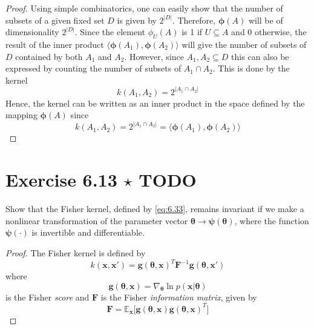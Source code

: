 \begin{proof}
    Using simple combinatorics, one can easily show that the number
    of subsets of a given fixed set $D$ is given by $2^{|D|}$.
    Therefore, $\bm{\phi}(A)$ will be of dimensionality $2^{|D|}$. Since
    the element $\phi_U(A)$ is 1 if $U \subseteq A$ and 0 otherwise,
    the result of the inner product $\langle \bm{\phi}(A_1), \bm{\phi}(A_2) \rangle$
    will give the number of subsets of $D$ contained by both $A_1$ and $A_2$. 
    However, since $A_1, A_2 \subseteq D$ this can also be expressed by counting
    the number of subsets of $A_1 \cap A_2$. This is done by the kernel
    \begin{equation*}
        k(A_1, A_2) = 2^{|A_1 \cap A_2|}
        \tag{6.27}\label{eq:6.27}
    \end{equation*}
    Hence, the kernel can be written as an inner product in the space defined
    by the mapping $\bm{\phi}(A)$ since
     \[
        k(A_1, A_2) = 2^{|A_1 \cap A_2|} = \langle \bm{\phi}(A_1), \bm{\phi}(A_2) \rangle
    \] 
\end{proof}

\section*{Exercise 6.13 $\star$ TODO}
Show that the Fisher kernel, defined by \eqref{eq:6.33}, remains
invariant if we make a nonlinear transformation of the parameter
vector $\bm{\theta} \to \bm{\psi}(\bm{\theta})$, where the function
$\bm{\psi}(\cdot)$ is invertible and differentiable.

\vspace{1em}

\begin{proof}
    The Fisher kernel is defined by
    \begin{equation*}
        k(\mathbf{x}, \mathbf{x}') 
        = \mathbf{g}(\bm{\theta}, \mathbf{x})^T \mathbf{F}^{-1} \mathbf{g}(\bm{\theta}, \mathbf{x}')
        \tag{6.33}\label{eq:6.33}
    \end{equation*}
    where 
    \begin{equation*}
        \mathbf{g}(\bm{\theta}, \mathbf{x}) 
        = \nabla_{\bm{\theta}} \ln p(\mathbf{x} | \bm{\theta})
        \tag{6.32}\label{eq:6.32}
    \end{equation*}
    is the Fisher \emph{score} and $\mathbf{F}$ is the Fisher \emph{information matrix}, given
    by
    \begin{equation*}
        \mathbf{F} = \mathbb{E}_\mathbf{x}\big[
        \mathbf{g}(\bm{\theta}, \mathbf{x})\mathbf{g}(\bm{\theta}, \mathbf{x})^T\big]
        \tag{6.34}\label{eq:6.34}
    \end{equation*}
\end{proof}

